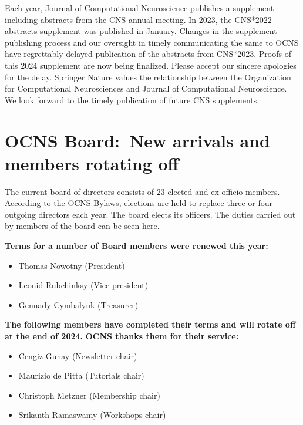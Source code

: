\documentclass[11pt,a4paper,oneside]{article}
\begin{document}
Each year, Journal of Computational Neuroscience publishes a supplement including abstracts from the CNS annual meeting.
In 2023, the CNS*2022 abstracts supplement was published in January.
Changes in the supplement publishing process and our oversight in timely communicating the same to OCNS have regrettably delayed publication of the abstracts from CNS*2023.
Proofs of this 2024 supplement are now being finalized.
Please accept our sincere apologies for the delay.
Springer Nature values the relationship between the Organization for Computational Neurosciences and Journal of Computational Neuroscience.
We look forward to the timely publication of future CNS supplements.


\clearpage
\section*{OCNS Board:\ New arrivals and members rotating off}%
\sectionauthor{\vspace{-4ex}}

The current board of directors consists of 23 elected and ex officio members.
According to the \href{https://www.cnsorg.org/ocns-bylaws-2011}{OCNS Bylaws}, \href{https://www.cnsorg.org/election-procedures}{elections} are held to replace three or four outgoing directors each year.
The board elects its officers.
The duties carried out by members of the board can be seen \href{https://www.cnsorg.org/quick-director-duties}{here}.

\textbf{Terms for a number of Board members were renewed this year:}
\begin{multicols}{2}
  \begin{itemize}
    \item Thomas Nowotny (President)
    \item Leonid Rubchinksy (Vice president)
    \item Gennady Cymbalyuk (Treasurer)
  \end{itemize}
\end{multicols}

\textbf{The following members have completed their terms and will rotate off at the end of 2024.}
\textbf{OCNS thanks them for their service:}
\begin{multicols}{2}
  \begin{itemize}
    \item Cengiz Gunay (Newsletter chair)
    \item Maurizio de Pitta (Tutorials chair)
    \item Christoph Metzner (Membership chair)
    \item Srikanth Ramaswamy (Workshops chair)
  \end{itemize}
\end{multicols}
\end{document}

